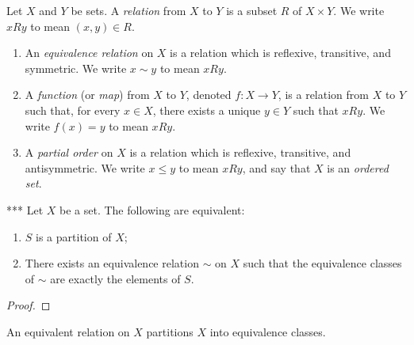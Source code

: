     \begin{definition}
        Let $X$ and $Y$ be sets. A \textit{relation} from $X$ to $Y$ is a subset $R$ of $X \times Y$. We write $xRy$ to mean $(x,y) \in R$.
            \begin{enumerate}[label = (\arabic*),itemsep=1pt,topsep=3pt]
                \item An \textit{equivalence relation} on $X$ is a relation which is reflexive, transitive, and symmetric. We write $x \sim y$ to mean $xRy$.
                \item A \textit{function} (or \textit{map}) from $X$ to $Y$, denoted $f:X \rightarrow Y$, is a relation from $X$ to $Y$ such that, for every $x \in X$, there exists a unique $y \in Y$ such that $xRy$. We write $f(x) = y$ to mean $xRy$.
                \item A \textit{partial order} on $X$ is a relation which is reflexive, transitive, and antisymmetric. We write $x \leq y$ to mean $xRy$, and say that $X$ is an \textit{ordered set}.
            \end{enumerate}
    \end{definition}

    \begin{proposition}***
        Let $X$ be a set. The following are equivalent:
        \begin{enumerate}[label = (\arabic*),itemsep=1pt,topsep=3pt]
            \item $S$ is a partition of $X$;
            \item There exists an equivalence relation $\sim$ on $X$ such that the equivalence classes of $\sim$ are exactly the elements of $S$.
        \end{enumerate}
    \end{proposition}
        \begin{proof}
            
        \end{proof}

    \begin{example}
        An equivalent relation on $X$ partitions $X$ into equivalence classes.
    \end{example}

